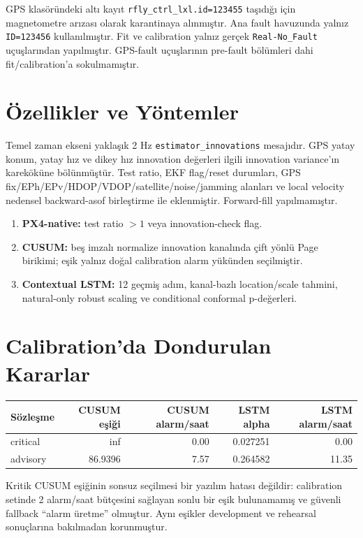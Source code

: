 \documentclass[11pt,a4paper]{article}
\begin{document}
GPS klasöründeki altı kayıt \texttt{rfly\_ctrl\_lxl.id=123455} taşıdığı için
magnetometre arızası olarak karantinaya alınmıştır. Ana fault havuzunda yalnız
\texttt{ID=123456} kullanılmıştır. Fit ve calibration yalnız gerçek
\texttt{Real-No\_Fault} uçuşlarından yapılmıştır. GPS-fault uçuşlarının
pre-fault bölümleri dahi fit/calibration'a sokulmamıştır.

\section{Özellikler ve Yöntemler}
Temel zaman ekseni yaklaşık 2 Hz \texttt{estimator\_innovations} mesajıdır.
GPS yatay konum, yatay hız ve dikey hız innovation değerleri ilgili innovation
variance'ın kareköküne bölünmüştür. Test ratio, EKF flag/reset durumları, GPS
fix/EPh/EPv/HDOP/VDOP/satellite/noise/jamming alanları ve local velocity
nedensel backward-asof birleştirme ile eklenmiştir. Forward-fill yapılmamıştır.

\begin{enumerate}
  \item \textbf{PX4-native:} test ratio $>1$ veya innovation-check flag.
  \item \textbf{CUSUM:} beş imzalı normalize innovation kanalında çift yönlü
  Page birikimi; eşik yalnız doğal calibration alarm yükünden seçilmiştir.
  \item \textbf{Contextual LSTM:} 12 geçmiş adım, kanal-bazlı location/scale
  tahmini, natural-only robust scaling ve conditional conformal p-değerleri.
\end{enumerate}

\section{Calibration'da Dondurulan Kararlar}
\begin{tabular}{lrrrr}
\toprule Sözleşme & CUSUM eşiği & CUSUM alarm/saat & LSTM alpha & LSTM alarm/saat \\
\midrule
critical & inf & 0.00 & 0.027251 & 0.00 \\
advisory & 86.9396 & 7.57 & 0.264582 & 11.35 \\
\bottomrule
\end{tabular}

Kritik CUSUM eşiğinin sonsuz seçilmesi bir yazılım hatası değildir: calibration
setinde 2 alarm/saat bütçesini sağlayan sonlu bir eşik bulunamamış ve güvenli
fallback ``alarm üretme'' olmuştur. Aynı eşikler development ve rehearsal
sonuçlarına bakılmadan korunmuştur.
\end{document}
